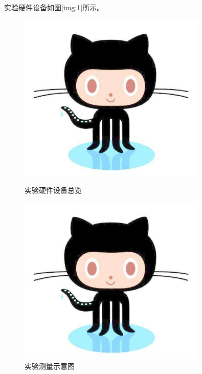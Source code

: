\documentclass[winfonts,bachelor,twoside]{njuthesis}
\begin{document}
实验硬件设备如图\ref{img:1}所示。
\begin{figure}[htbp]
\begin{minipage}[t]{0.5\textwidth}
\centering
\includegraphics[width=0.8\textwidth]{./figure/github.jpg}
\caption{实验硬件设备总览}
\label{img:1}
\end{minipage}
\begin{minipage}[t]{0.5\textwidth}
\centering
\includegraphics[width=0.8\textwidth]{./figure/github.jpg}
\caption{实验测量示意图}
\label{img:2}
\end{minipage}
\end{figure}
\end{document}
